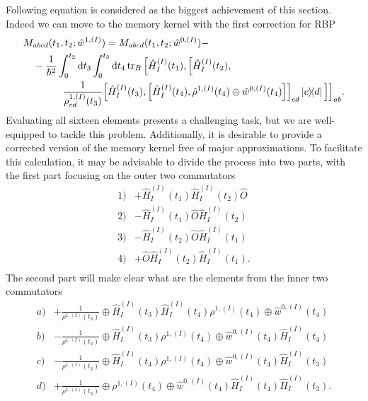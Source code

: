Following equation is considered as the biggest achievement of this section. Indeed we can move to the memory kernel with the first correction for RBP
\begin{equation}
    \begin{aligned}
    &M_{abcd}(t_1, t_2; \hat{w}^{1,(I)}) = M_{abcd}(t_1, t_2; \hat{w}^{0,(I)}) - \\
    &\quad -\frac{1}{\hbar^2} \int_{0}^{t_2} \mathrm{d} t_3 \int_{0}^{t_3} \mathrm{d} t_4 \operatorname{tr}_B \Big[ \hat{H}_{I}^{(I)}(t_1), \Big[\hat{H}_{I}^{(I)}(t_2), \\
    &\quad \quad \quad \quad  \frac{1}{\rho^{1, (I)}_{cd}(t_3)}\Big[\hat{H}_{I}^{(I)}(t_3), \Big[\hat{H}_{I}^{(I)}(t_4), \hat{\rho}^{1, (I)}(t_4) \oplus \hat{w}^{0, (I)}(t_4) \Big]\Big]_{cd} \ketbra{c}{d} \Big]\Big]_{ab}.
    \end{aligned}
\end{equation}
Evaluating all sixteen elements presents a challenging task, but we are well-equipped to tackle this problem. Additionally, it is desirable to provide a corrected version of the memory kernel free of major approximations. To facilitate this calculation, it may be advisable to divide the process into two parts, with the first part focusing on the outer two commutators
\begin{equation}
\label{commutators_1234}
    \begin{array}{rl}
        1) & +\hat{H}_{I}^{(I)}(t_1) \hat{H}_{I}^{(I)}(t_2) \hat{O} \\
        2) & -\hat{H}_{I}^{(I)}(t_1) \hat{O}  \hat{H}_{I}^{(I)}(t_2) \\
        3) & - \hat{H}_{I}^{(I)}(t_2) \hat{O} \hat{H}_{I}^{(I)}(t_1) \\
        4) & + \hat{O} \hat{H}_{I}^{(I)}(t_2) \hat{H}_{I}^{(I)}(t_1). \\
    \end{array}
\end{equation}
The second part will make clear what are the elements from the inner two commutators
\begin{equation}
\label{commutators_abcd}
    \begin{array}{rl}
        a) & + \frac{1}{\rho^{1, (I)}(t_3)} \oplus \hat{H}_{I}^{(I)}(t_3) \hat{H}_{I}^{(I)}(t_4) \rho^{1, (I)}(t_4) \oplus \hat{w}^{0, (I)}(t_4) \\
        b) & - \frac{1}{\rho^{1, (I)}(t_3)} \oplus \hat{H}_{I}^{(I)}(t_3) \rho^{1, (I)}(t_4) \oplus \hat{w}^{0, (I)}(t_4) \hat{H}_{I}^{(I)}(t_4)  \\
        c) & - \frac{1}{\rho^{1, (I)}(t_3)} \oplus \hat{H}_{I}^{(I)}(t_4) \rho^{1, (I)}(t_4) \oplus \hat{w}^{0, (I)}(t_4) \hat{H}_{I}^{(I)}(t_3)  \\
        d) & + \frac{1}{\rho^{1, (I)}(t_3)} \oplus \rho^{1, (I)}(t_4) \oplus \hat{w}^{0, (I)}(t_4) \hat{H}_{I}^{(I)}(t_4)  \hat{H}_{I}^{(I)}(t_3). \\
    \end{array}
\end{equation}
